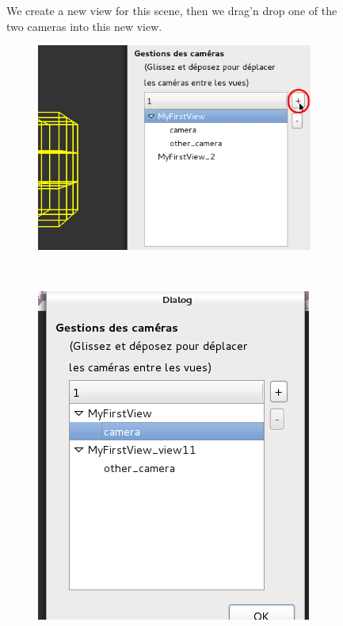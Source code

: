 \documentclass[a4paper]{scrreprt}
\begin{document}
	\begin{figure}[!]
	We create a new view for this scene, then we drag'n drop one of the two cameras
	into this new view.\\
        \begin{subfigure}[h!p]{0.6\textwidth}
                \centering
       		\includegraphics[width=\textwidth]{images/screenshot10}
        \end{subfigure}
        ~
        \begin{subfigure}[h!p]{0.5\textwidth}
                \centering
        	\includegraphics[width=\textwidth]{images/screenshot11}        
        \end{subfigure}
	\end{figure}
\end{document}
